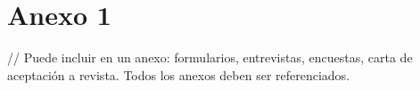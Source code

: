 \chapter{Anexo 1 \label{cap:Anexo1}}

// Puede incluir en un anexo: formularios, entrevistas, encuestas, carta de aceptación a revista. Todos los anexos deben ser referenciados.